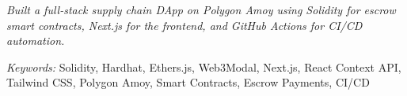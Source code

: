 \nointent {}
 

\nointent \textit{Built a full-stack supply chain DApp on Polygon Amoy using Solidity for escrow smart contracts, Next.js for the frontend, and GitHub Actions for CI/CD automation.} 

\nointent \textit{Keywords:} Solidity, Hardhat, Ethers.js, Web3Modal, Next.js, React Context API, Tailwind CSS, Polygon Amoy, Smart Contracts, Escrow Payments, CI/CD 
